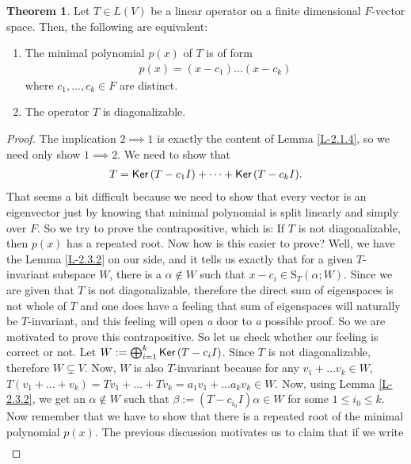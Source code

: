 \documentclass[letterpaper,11pt,twoside]{article}
\theoremstyle{definition}
\theoremstyle{definition}
\newtheorem{theorem}[proposition]{Theorem}
\theoremstyle{definition}
\theoremstyle{definition}
\theoremstyle{definition}
\theoremstyle{definition}
\theoremstyle{remark}
\theoremstyle{definition}
\newcommand{\Ker}[1]{{\fontfamily{lmss}\selectfont 
		\text{Ker}\left (#1\right )
}}
\newcommand{\cond}[3]{\text{S}_{#1}\left(#2;#3\right)}
\begin{document}
    \begin{theorem}\label{T-2.3.3}
    Let $T\in L(V)$ be a linear operator on a finite dimensional $F$-vector space. Then, the following are equivalent:
    \begin{enumerate}
        \item {The minimal polynomial $p(x)$ of $T$ is of form
    \begin{align*}
        p(x) = (x-c_1)\dots (x-c_k)
    \end{align*}
    where $c_1,\dots, c_k \in F$ are distinct.
        }
        \item{The operator $T$ is diagonalizable.}
    \end{enumerate}
    \end{theorem}
    \begin{proof}
    The implication $2 \implies 1$ is exactly the content of Lemma \ref{L-2.1.4}, so we need only show $1\implies 2$. We need to show that
    \begin{align*}
        T = \Ker{T-c_1 I} + \dots +\Ker{T-c_k I}.
    \end{align*}
    That seems a bit difficult because we need to show that every vector is an eigenvector just by knowing that minimal polynomial is split linearly and simply over $F$. So we try to prove the contrapositive, which is: If $T$ is not diagonalizable, then $p(x)$ has a repeated root. Now how is this easier to prove? Well, we have the Lemma \ref{L-2.3.2} on our side, and it tells us exactly that for a given $T$-invariant subspace $W$, there is a $\alpha \notin W$ such that $x-c_i \in \cond{T}{\alpha}{W}$. Since we are given that $T$ is not diagonalizable, therefore the direct sum of eigenspaces is not whole of $T$ and one does have a feeling that sum of eigenspaces will naturally be $T$-invariant, and this feeling will open \textit{a} door to \textit{a} possible proof. So we are motivated to prove this contrapositive. So let us check whether our feeling is correct or not. Let $W := \bigoplus_{i=1}^k \Ker{T-c_iI}$. Since $T$ is not diagonalizable, therefore $W\subsetneq V$. Now, $W$ is also $T$-invariant because for any $v_1 + \dots v_k \in W$, $T(v_1+\dots + v_k ) = Tv_1 + \dots + Tv_k = a_1v_1 + \dots a_kv_k \in W$. Now, using Lemma \ref{L-2.3.2}, we get an $\alpha \notin W$ such that $\beta := (T-c_{i_0}I)\alpha \in W$ for some $1\le i_0\le k$. Now remember that we have to show that there is a repeated root of the minimal polynomial $p(x)$. The previous discussion motivates us to claim that if we write
    \begin{align*}

\end{align*}
\end{proof}
\end{document}
